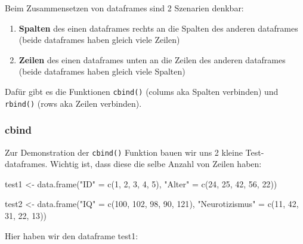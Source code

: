 \documentclass[
]{book}
\newenvironment{Shaded}{\begin{snugshade}}{\end{snugshade}}
\newcommand{\DecValTok}[1]{\textcolor[rgb]{0.00,0.00,0.81}{#1}}
\newcommand{\FunctionTok}[1]{\textcolor[rgb]{0.00,0.00,0.00}{#1}}
\newcommand{\NormalTok}[1]{#1}
\newcommand{\OtherTok}[1]{\textcolor[rgb]{0.56,0.35,0.01}{#1}}
\newcommand{\StringTok}[1]{\textcolor[rgb]{0.31,0.60,0.02}{#1}}
\providecommand{\tightlist}{%
  \setlength{\itemsep}{0pt}\setlength{\parskip}{0pt}}
\begin{document}
Beim Zusammensetzen von dataframes sind 2 Szenarien denkbar:

\begin{enumerate}
\def\labelenumi{\arabic{enumi}.}
\tightlist
\item
  \textbf{Spalten} des einen dataframes rechts an die Spalten des anderen dataframes (beide dataframes haben gleich viele Zeilen)
\item
  \textbf{Zeilen} des einen dataframes unten an die Zeilen des anderen dataframes (beide dataframes haben gleich viele Spalten)
\end{enumerate}

Dafür gibt es die Funktionen \texttt{cbind()} (colums aka Spalten verbinden) und \texttt{rbind()} (rows aka Zeilen verbinden).

\hypertarget{cbind}{%
\subsubsection{cbind}\label{cbind}}

Zur Demonstration der \texttt{cbind()} Funktion bauen wir uns 2 kleine Test-dataframes. Wichtig ist, dass diese die selbe Anzahl von Zeilen haben:

\begin{Shaded}
\begin{Highlighting}[]
\NormalTok{test1 }\OtherTok{\textless{}{-}} \FunctionTok{data.frame}\NormalTok{(}\StringTok{"ID"} \OtherTok{=} \FunctionTok{c}\NormalTok{(}\DecValTok{1}\NormalTok{, }\DecValTok{2}\NormalTok{, }\DecValTok{3}\NormalTok{, }\DecValTok{4}\NormalTok{, }\DecValTok{5}\NormalTok{),}
                     \StringTok{"Alter"} \OtherTok{=} \FunctionTok{c}\NormalTok{(}\DecValTok{24}\NormalTok{, }\DecValTok{25}\NormalTok{, }\DecValTok{42}\NormalTok{, }\DecValTok{56}\NormalTok{, }\DecValTok{22}\NormalTok{))}

\NormalTok{test2 }\OtherTok{\textless{}{-}} \FunctionTok{data.frame}\NormalTok{(}\StringTok{"IQ"} \OtherTok{=} \FunctionTok{c}\NormalTok{(}\DecValTok{100}\NormalTok{, }\DecValTok{102}\NormalTok{, }\DecValTok{98}\NormalTok{, }\DecValTok{90}\NormalTok{, }\DecValTok{121}\NormalTok{),}
                     \StringTok{"Neurotizismus"} \OtherTok{=} \FunctionTok{c}\NormalTok{(}\DecValTok{11}\NormalTok{, }\DecValTok{42}\NormalTok{, }\DecValTok{31}\NormalTok{, }\DecValTok{22}\NormalTok{, }\DecValTok{13}\NormalTok{))}
\end{Highlighting}
\end{Shaded}

Hier haben wir den dataframe test1:
\end{document}
